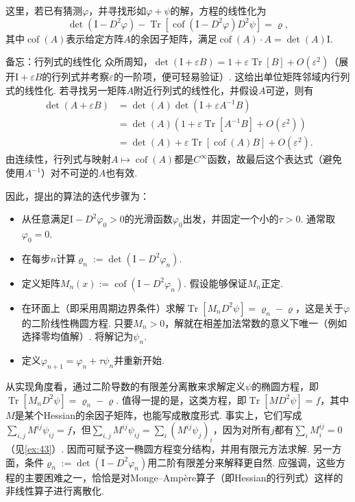 这里，若已有猜测$\varphi$，并寻找形如$\varphi+\psi$的解，方程的线性化为
\[
\det(\mathrm I-D^2\varphi)
-\operatorname{Tr}[\operatorname{cof}(\mathrm I-D^2\varphi)D^2\psi]
=\varrho,
\]
其中$\operatorname{cof}(A)$表示给定方阵$A$的余因子矩阵，满足$\operatorname{cof}(A)\cdot A=\det(A)\mathrm I$.

\begin{sourcebox}{备忘：行列式的线性化}\label{box:6.5}
众所周知，$\det(\mathrm I+\varepsilon B)=1+\varepsilon\operatorname{Tr}[B]+O(\varepsilon^2)$（展开$\mathrm I+\varepsilon B$的行列式并考察$\varepsilon$的一阶项，便可轻易验证）. 这给出单位矩阵邻域内行列式的线性化. 若寻找另一矩阵$A$附近行列式的线性化，并假设$A$可逆，则有
\[
\begin{aligned}
\det(A+\varepsilon B)
&=\det(A)\det(\mathrm I+\varepsilon A^{-1}B)\\
&=\det(A)(1+\varepsilon\operatorname{Tr}[A^{-1}B]+O(\varepsilon^2))\\
&=\det(A)+\varepsilon\operatorname{Tr}[\operatorname{cof}(A)B]+O(\varepsilon^2).
\end{aligned}
\]
由连续性，行列式与映射$A\mapsto\operatorname{cof}(A)$都是$C^\infty$函数，故最后这个表达式（避免使用$A^{-1}$）对不可逆的$A$也有效.
\end{sourcebox}

因此，\cite{b217}提出的算法的迭代步骤为：
\begin{itemize}
\item 从任意满足$\mathrm I-D^2\varphi_0>0$的光滑函数$\varphi_0$出发，并固定一个小的$\tau>0$. 通常取$\varphi_0=0$.
\item 在每步$n$计算$\varrho_n:=\det(\mathrm I-D^2\varphi_n)$.
\item 定义矩阵$M_n(x):=\operatorname{cof}(\mathrm I-D^2\varphi_n)$. 假设能够保证$M_n$正定.
\item 在环面上（即采用周期边界条件）求解$\operatorname{Tr}[M_nD^2\psi]=\varrho_n-\varrho$，这是关于$\varphi$的二阶线性椭圆方程. 只要$M_n>0$，解就在相差加法常数的意义下唯一（例如选择零均值解）. 将解记为$\psi_n$.
\item 定义$\varphi_{n+1}=\varphi_n+\tau\psi_n$并重新开始.
\end{itemize}
从实现角度看，\cite{b217}通过二阶导数的有限差分离散来求解定义$\psi$的椭圆方程，即$\operatorname{Tr}[M_nD^2\psi]=\varrho_n-\varrho$. 值得一提的是，这类方程，即$\operatorname{Tr}[MD^2\psi]=f$，其中$M$是某个Hessian的余因子矩阵，也能写成散度形式. 事实上，它们写成$\sum_{i,j}M^{ij}\psi_{ij}=f$，但$\sum_{i,j}M^{ij}\psi_{ij}=\sum_i(M^{ij}\psi_j)_i$，因为对所有$j$都有$\sum_iM_i^{ij}=0$（见\autoref{ex:43}）. 因而可赋予这一椭圆方程变分结构，并用有限元方法求解. 另一方面，条件$\varrho_n:=\det(\mathrm I-D^2\varphi_n)$用二阶有限差分来解释更自然. 应强调，这些方程的主要困难之一，恰恰是对Monge--Ampère算子（即Hessian的行列式）这样的非线性算子进行离散化.


